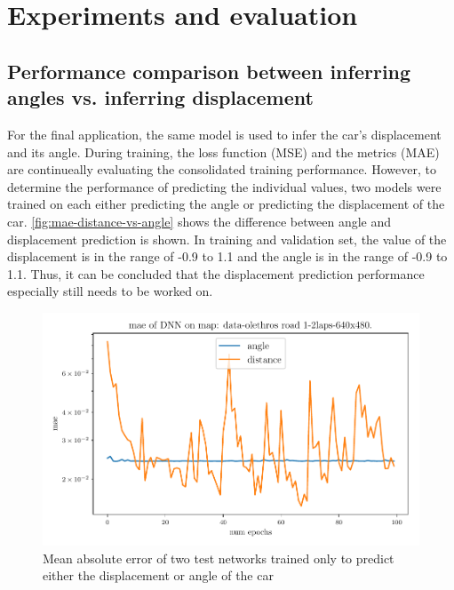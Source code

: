 \documentclass[10pt,a4paper,twoside,journal]{IEEEtran}
\begin{document}
\section{Experiments and evaluation}
\label{sc:evaluation}

\subsection{Performance comparison between inferring angles vs. inferring displacement}
For the final application, the same model is used to infer the car's displacement and its angle. During training, the loss function (MSE) and the metrics (MAE) are continueally evaluating the consolidated training performance. However, to determine the performance of predicting the individual values, two models were trained on each either predicting the angle or predicting the displacement of the car. \autoref{fig:mae-distance-vs-angle} shows the difference between angle and displacement prediction is shown. In training and validation set, the value of the displacement is in the range of -0.9 to 1.1 and the angle is in the range of -0.9 to 1.1. Thus, it can be concluded that the displacement prediction performance especially still needs to be worked on. 

\begin{figure}[ht]
	\centering
	\includegraphics[width=\columnwidth]{attachments/alexnet-val_mae-angle_dist_comp-05425-86589.pdf}
	\caption{Mean absolute error of two test networks trained only to predict either the displacement or angle of the car}
	\label{fig:mae-distance-vs-angle}
\end{figure}
\end{document}
